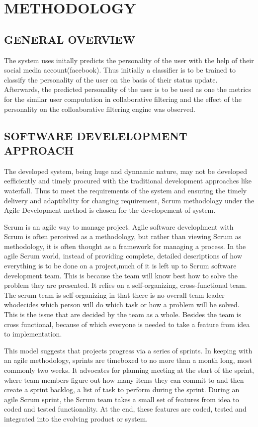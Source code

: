 \newpage
\section{METHODOLOGY}

\subsection{GENERAL OVERVIEW}
The system uses initally predicts the personality of the user with the help of their social media account(facebook). Thus initially a classifier is to be trained to classify the personality of the user on the basis of their status update. Afterwards, the predicted personality of the user is to be used as one the metrics for the similar user computation in collaborative filtering and the effect of the personality on the colloaborative filtering engine was observed.
\subsection{SOFTWARE DEVELELOPMENT APPROACH}
The developed system, being huge and dynnamic nature, may not be developed eefficiently and timely procured with the traditional development approaches like waterfall. Thus to meet the requirements of the system and ensuring the timely delivery and adaptibility for changing requirement, Scrum methodology under the Agile Development method is chosen for the developement of system.

Scrum is an agile way to manage project. Agile software developlment with Scrum is often perceived as a methodology, but rather than viewing Scrum as methodology, it is often thought as a framework for managing a process. In the agile Scrum world, instead of providing complete, detailed descriptions of how everything is to be done on a project,much of it is left up to Scrum software development team. This is because the team will know best how to solve the problem they are presented. It relies on a self-organizing, cross-functional team. The scrum team is self-organizing in that there is no overall team leader whodecides which person will do which task or how a problem will be solved. This is the issue that are decided by the team as a whole. Besides the team is cross functional, because of which everyone is needed to take a feature from idea to implementation. 

This model suggests that projects progress via a series of sprints. In keeping with an agile methodology, sprints are timeboxed to no more than a month long, most commonly two weeks. It advocates for planning meeting at the start of the sprint, where team members figure out how many items they can commit to and then create a sprint backlog, a list of task to perform during the sprint. During an agile Scrum sprint, the Scrum team takes a small set of features from idea to coded and tested functionality. At the end, these features are coded, tested and integrated into the evolving product or system.

